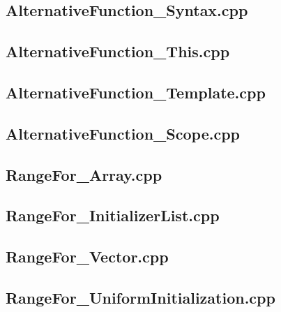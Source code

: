 \documentclass[11pt]{report}
\begin{document}
\begin{appendix}
\subsection{AlternativeFunction\_Syntax.cpp}
\label{AlternativeFunction_Syntax}


\subsection{AlternativeFunction\_This.cpp}
\label{AlternativeFunction_This}


\subsection{AlternativeFunction\_Template.cpp}
\label{AlternativeFunction_Template}


\subsection{AlternativeFunction\_Scope.cpp}
\label{AlternativeFunction_Scope}


\subsection{RangeFor\_Array.cpp}
\label{RangeFor_Array}


\subsection{RangeFor\_InitializerList.cpp}
\label{RangeFor_InitializerList}


\subsection{RangeFor\_Vector.cpp}
\label{RangeFor_Vector}


\subsection{RangeFor\_UniformInitialization.cpp}
\label{RangeFor_UniformInitialization}



\end{appendix}
\end{document}
